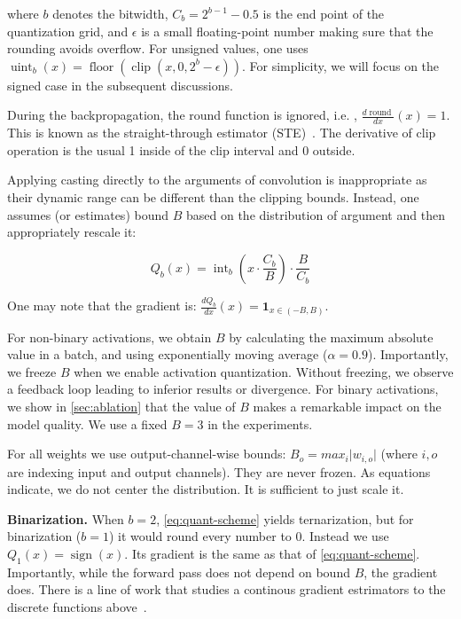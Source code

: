 where $b$ denotes the bitwidth, $C_b=2^{b-1}-0.5$ is the end point of the quantization grid, and $\epsilon$ is a small floating-point number making sure that the rounding avoids overflow. For unsigned values, one uses 
$\operatorname{uint}_b(x)=\operatorname{floor}(\operatorname{clip}(x, 0, 2^b-\epsilon))$. For simplicity, we will focus on the signed case in the subsequent discussions.

During the backpropagation, the round function is ignored, i.e. , $\frac{d\operatorname{round}}{dx}(x) = 1$. This is known as the straight-through estimator (STE)~\cite{hubara2016bnn}. The derivative of clip operation is the usual 1 inside of the clip interval and 0 outside.

Applying casting directly to the arguments of convolution is inappropriate as their dynamic range can be different than the clipping bounds. Instead, one assumes (or estimates) bound $B$ based on the distribution of argument and then appropriately rescale it:

\begin{equation}
\label{eq:quant-scheme}
    Q_b(x) = \operatorname{int}_b(x\cdot\frac{C_b}{B}) \cdot \frac{B}{C_b}
\end{equation}

One may note that the gradient is:
$\frac{dQ_b}{dx}(x) = \mathbf{1}_{x \in (-B, B)}$.

For non-binary activations, we obtain $B$ by calculating the maximum absolute value in a batch, and using exponentially moving average ($\alpha=0.9$). Importantly, we freeze $B$ when we enable activation quantization. Without freezing, we observe a feedback loop leading to inferior results or divergence. For binary activations, we show in \ref{sec:ablation} that the value of $B$ makes a remarkable impact on the model quality. We use a fixed $B=3$ in the experiments.

For all weights we use output-channel-wise bounds: $B_o = max_i \lvert w_{i,o} \rvert$ (where $i,o$ are indexing input and output channels). They are never frozen. As equations indicate, we do not center the distribution. It is sufficient to just scale it.

\textbf{Binarization.}
When $b=2$, \ref{eq:quant-scheme} yields ternarization, but for binarization ($b=1$) it would round every number to 0. Instead we use $Q_1(x) = \operatorname{sign}(x)$. Its gradient is the same as that of \ref{eq:quant-scheme}.
Importantly, while the forward pass does not depend on bound $B$, the gradient does. There is a line of work that studies a continous gradient estrimators to the discrete functions above~\cite{zhou2018dorefanet, gong2019dsq, qin2020irnet, Liu2018bireal}.

